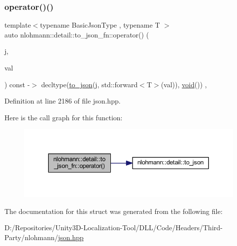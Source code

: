 \subsubsection{\texorpdfstring{operator()()}{operator()()}}
{\footnotesize\ttfamily template$<$typename Basic\+Json\+Type , typename T $>$ \\
auto nlohmann\+::detail\+::to\+\_\+json\+\_\+fn\+::operator() (\begin{DoxyParamCaption}\item[{Basic\+Json\+Type \&}]{j,  }\item[{T \&\&}]{val }\end{DoxyParamCaption}) const -\/$>$ decltype(\mbox{\hyperlink{namespacenlohmann_1_1detail_a1a804b98cbe89b7e44b698f2ca860490}{to\+\_\+json}}(j, std\+::forward$<$T$>$(val)), \mbox{\hyperlink{namespacenlohmann_1_1detail_a59fca69799f6b9e366710cb9043aa77d}{void}}())
    \hspace{0.3cm}{\ttfamily [inline]}, {\ttfamily [noexcept]}}



Definition at line 2186 of file json.\+hpp.

Here is the call graph for this function\+:
\nopagebreak
\begin{figure}[H]
\begin{center}
\leavevmode
\includegraphics[width=343pt]{structnlohmann_1_1detail_1_1to__json__fn_aecfb5114c8a737fc89d98589482795b8_cgraph}
\end{center}
\end{figure}


The documentation for this struct was generated from the following file\+:\begin{DoxyCompactItemize}
\item 
D\+:/\+Repositories/\+Unity3\+D-\/\+Localization-\/\+Tool/\+D\+L\+L/\+Code/\+Headers/\+Third-\/\+Party/nlohmann/\mbox{\hyperlink{json_8hpp}{json.\+hpp}}\end{DoxyCompactItemize}
